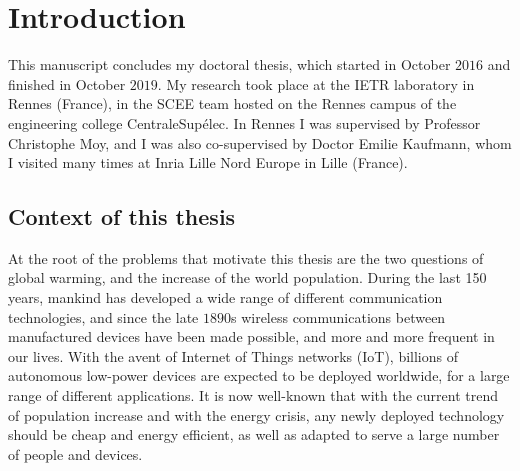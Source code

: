
\chapter{Introduction}
\label{chapter:1}





\graphicspath{{2-Chapters/1-Chapter/Images/}}

%
This manuscript concludes my doctoral thesis, which started in October $2016$ and finished in October $2019$.
My research took place at the IETR laboratory in Rennes (France), in the SCEE team hosted on the Rennes campus of the engineering college CentraleSupélec.
In Rennes I was supervised by Professor Christophe Moy,
and I was also co-supervised by Doctor Emilie Kaufmann, whom I visited many times at Inria Lille Nord Europe in Lille (France).



\section{Context of this thesis}
\label{sec:1:problems}

%
At the root of the problems that motivate this thesis are the two questions of global warming, and the increase of the world population.
During the last 150 years, mankind has developed a wide range of different communication technologies, and since the late $1890$s wireless communications between manufactured devices have been made possible, and more and more frequent in our lives.
With the avent of Internet of Things networks (IoT), billions of autonomous low-power devices are expected to be deployed worldwide, for a large range of different applications.
It is now well-known that with the current trend of population increase and with the energy crisis, any newly deployed technology should be cheap and energy efficient,
as well as adapted to serve a large number of people and devices.

